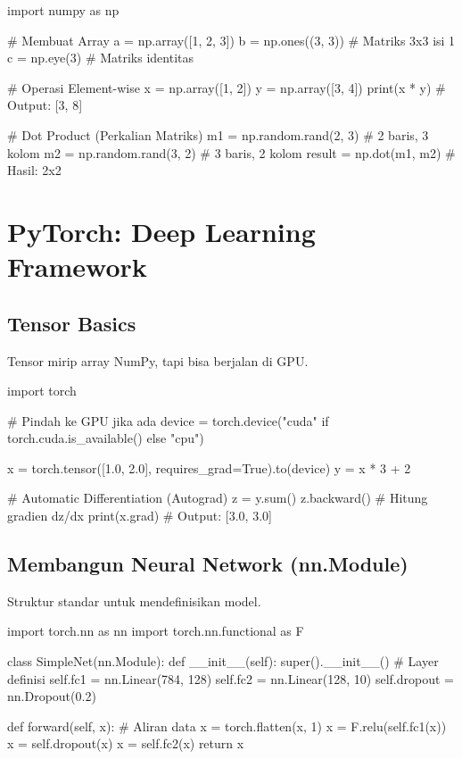 \begin{codeblock}[language=Python]
import numpy as np

# Membuat Array
a = np.array([1, 2, 3])
b = np.ones((3, 3))     # Matriks 3x3 isi 1
c = np.eye(3)           # Matriks identitas

# Operasi Element-wise
x = np.array([1, 2])
y = np.array([3, 4])
print(x * y) # Output: [3, 8]

# Dot Product (Perkalian Matriks)
m1 = np.random.rand(2, 3) # 2 baris, 3 kolom
m2 = np.random.rand(3, 2) # 3 baris, 2 kolom
result = np.dot(m1, m2)   # Hasil: 2x2
\end{codeblock}

\section{PyTorch: Deep Learning Framework}

\subsection{Tensor Basics}
Tensor mirip array NumPy, tapi bisa berjalan di GPU.
\begin{codeblock}[language=Python]
import torch

# Pindah ke GPU jika ada
device = torch.device("cuda" if torch.cuda.is_available() else "cpu")

x = torch.tensor([1.0, 2.0], requires_grad=True).to(device)
y = x * 3 + 2

# Automatic Differentiation (Autograd)
z = y.sum()
z.backward() # Hitung gradien dz/dx
print(x.grad) # Output: [3.0, 3.0]
\end{codeblock}

\subsection{Membangun Neural Network (nn.Module)}
Struktur standar untuk mendefinisikan model.

\begin{codeblock}[language=Python]
import torch.nn as nn
import torch.nn.functional as F

class SimpleNet(nn.Module):
    def __init__(self):
        super().__init__()
        # Layer definisi
        self.fc1 = nn.Linear(784, 128)
        self.fc2 = nn.Linear(128, 10)
        self.dropout = nn.Dropout(0.2)

    def forward(self, x):
        # Aliran data
        x = torch.flatten(x, 1)
        x = F.relu(self.fc1(x))
        x = self.dropout(x)
        x = self.fc2(x)
        return x
\end{codeblock}

